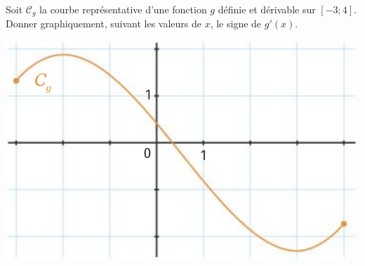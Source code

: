 \documentclass[11pt]{article}
\begin{document}
\begin{app}
  \begin{minipage}{.5\textwidth}
    Soit $\mathscr C_g$ la courbe représentative d'une fonction $g$ définie et
    dérivable sur $[-3;4]$.\\
    Donner graphiquement, suivant les valeurs de $x$, le signe de $g'(x)$.
  \end{minipage}
  \begin{minipage}{.5\textwidth}
    \begin{center}
      \includegraphics[scale=.25]{thm1.png}
    \end{center}
  \end{minipage}
  
\end{app}
\end{document}

